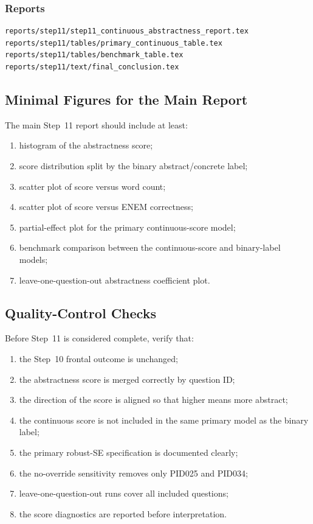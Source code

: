 \subsubsection*{Reports}
\begin{verbatim}
reports/step11/step11_continuous_abstractness_report.tex
reports/step11/tables/primary_continuous_table.tex
reports/step11/tables/benchmark_table.tex
reports/step11/text/final_conclusion.tex
\end{verbatim}

\subsection{Minimal Figures for the Main Report}
The main Step~11 report should include at least:
\begin{enumerate}
    \item histogram of the abstractness score;
    \item score distribution split by the binary abstract/concrete label;
    \item scatter plot of score versus word count;
    \item scatter plot of score versus ENEM correctness;
    \item partial-effect plot for the primary continuous-score model;
    \item benchmark comparison between the continuous-score and binary-label models;
    \item leave-one-question-out abstractness coefficient plot.
\end{enumerate}

\subsection{Quality-Control Checks}
Before Step~11 is considered complete, verify that:
\begin{enumerate}
    \item the Step~10 frontal outcome is unchanged;
    \item the abstractness score is merged correctly by question ID;
    \item the direction of the score is aligned so that higher means more abstract;
    \item the continuous score is not included in the same primary model as the binary label;
    \item the primary robust-SE specification is documented clearly;
    \item the no-override sensitivity removes only PID025 and PID034;
    \item leave-one-question-out runs cover all included questions;
    \item the score diagnostics are reported before interpretation.
\end{enumerate}

